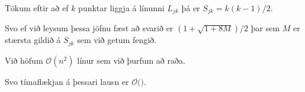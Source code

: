 {
	{
		\item<1-> Tökum eftir að ef $k$ punktar liggja á línunni $L_{jk}$ þá er $S_{jk} = k(k - 1)/2$.
		\item<2-> Svo ef við leysum þessa jöfnu fæst að svarið er $(1 + \sqrt{1 + 8M})/2$ þar sem $M$ er stærsta gildið á $S_{jk}$ sem við getum fengið.
	}
}

{
}

{
}

{
	{
		\item<1-> Við höfum $\mathcal{O}(n^2)$ línur sem við þurfum að raða.
		\item<2-> Svo tímaflækjan á þessari lausn er $\mathcal{O}($\onslide<3->{$n^2 \log n$}$)$.
	}
}

{
}



